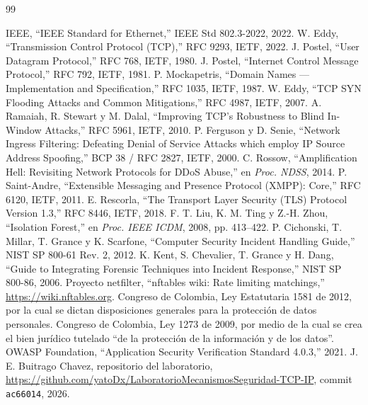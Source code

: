 \begin{thebibliography}{99}
 IEEE, ``IEEE Standard for Ethernet,'' IEEE Std 802.3-2022, 2022.
 W. Eddy, ``Transmission Control Protocol (TCP),'' RFC 9293, IETF, 2022.
 J. Postel, ``User Datagram Protocol,'' RFC 768, IETF, 1980.
 J. Postel, ``Internet Control Message Protocol,'' RFC 792, IETF, 1981.
 P. Mockapetris, ``Domain Names — Implementation and Specification,'' RFC 1035, IETF, 1987.
 W. Eddy, ``TCP SYN Flooding Attacks and Common Mitigations,'' RFC 4987, IETF, 2007.
 A. Ramaiah, R. Stewart y M. Dalal, ``Improving TCP's Robustness to Blind In-Window Attacks,'' RFC 5961, IETF, 2010.
 P. Ferguson y D. Senie, ``Network Ingress Filtering: Defeating Denial of Service Attacks which employ IP Source Address Spoofing,'' BCP 38 / RFC 2827, IETF, 2000.
 C. Rossow, ``Amplification Hell: Revisiting Network Protocols for DDoS Abuse,'' en \emph{Proc. NDSS}, 2014.
 P. Saint-Andre, ``Extensible Messaging and Presence Protocol (XMPP): Core,'' RFC 6120, IETF, 2011.
 E. Rescorla, ``The Transport Layer Security (TLS) Protocol Version 1.3,'' RFC 8446, IETF, 2018.
 F. T. Liu, K. M. Ting y Z.-H. Zhou, ``Isolation Forest,'' en \emph{Proc. IEEE ICDM}, 2008, pp. 413--422.
 P. Cichonski, T. Millar, T. Grance y K. Scarfone, ``Computer Security Incident Handling Guide,'' NIST SP 800-61 Rev. 2, 2012.
 K. Kent, S. Chevalier, T. Grance y H. Dang, ``Guide to Integrating Forensic Techniques into Incident Response,'' NIST SP 800-86, 2006.
 Proyecto netfilter, ``nftables wiki: Rate limiting matchings,'' \url{https://wiki.nftables.org}.
 Congreso de Colombia, Ley Estatutaria 1581 de 2012, por la cual se dictan disposiciones generales para la protección de datos personales.
 Congreso de Colombia, Ley 1273 de 2009, por medio de la cual se crea el bien jurídico tutelado ``de la protección de la información y de los datos''.
 OWASP Foundation, ``Application Security Verification Standard 4.0.3,'' 2021.
 J. E. Buitrago Chavez, repositorio del laboratorio, \url{https://github.com/yatoDx/LaboratorioMecanismosSeguridad-TCP-IP}, commit \texttt{ac66014}, 2026.
\end{thebibliography}
